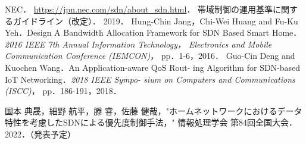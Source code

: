 \documentclass[a4paper,11pt,uplatex]{ujreport}
\begin{document}




\renewcommand{\bibname}{参考文献}

\begin{thebibliography}{99}
   NEC． \url{https://jpn.nec.com/sdn/about_sdn.html}．
   帯域制御の運用基準に関するガイドライン（改定）． 2019．
   Hung-Chin Jang，Chi-Wei Huang and Fu-Ku Yeh．Design
  A Bandwidth Allocation Framework for SDN Based Smart
  Home．\textit{2016 IEEE 7th Annual Information Technology，
  Electronics and Mobile Communication Conference (IEMCON)}，
  pp．1-6，2016．
   Guo-Cin Deng and Kuochen Wang．An Application-aware QoS Rout-
  ing Algorithm for SDN-based IoT Networking．\textit{2018 IEEE Sympo-
  sium on Computers and Communications (ISCC)}， pp．186-191，2018．
\end{thebibliography}

% 
% 

\label{chap:Bibiliography}

\renewcommand{\bibname}{研究業績}

\begin{thebibliography}{99}
  \bibitem{} 国本 典晟，細野 航平，滕 睿，佐藤 健哉，"ホームネットワークにおけるデータ特性を考慮したSDNによる優先度制御手法，" 情報処理学会 第84回全国大会．2022．（発表予定）
\end{thebibliography}

\label{chap:Publications}

\end{document}
